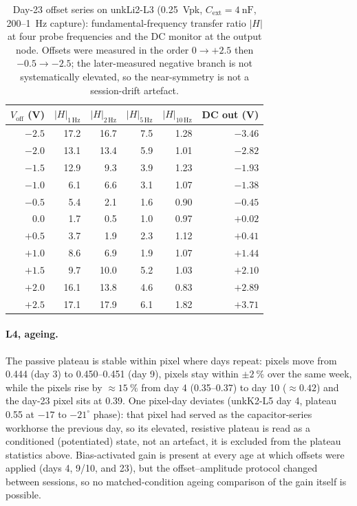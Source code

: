 \begin{table}[t]
  \centering
  \caption[Lock-in day-23 bias series]{Day-23 offset series on unkLi2-L3
  (\SI{0.25}{Vpk}, \(C_\mathrm{ext}=\SI{4}{\nano\farad}\), 200--1~Hz capture):
  fundamental-frequency transfer ratio \(|H|\) at four probe frequencies and
  the DC monitor at the output node. Offsets were measured in the order
  \(0\to+2.5\) then \(-0.5\to-2.5\); the later-measured negative branch is not
  systematically elevated, so the near-symmetry is not a session-drift
  artefact.}
  \label{tab:ch4_lockin_gain}
  \footnotesize
  \setlength{\tabcolsep}{5.5pt}
  \begin{tabular}{rrrrrr}
    \toprule
    \(V_\mathrm{off}\) (V) & \(|H|_{1\,\mathrm{Hz}}\) & \(|H|_{2\,\mathrm{Hz}}\) & \(|H|_{5\,\mathrm{Hz}}\) & \(|H|_{10\,\mathrm{Hz}}\) & DC out (V) \\
    \midrule
    \(-2.5\) & 17.2 & 16.7 & 7.5 & 1.28 & \(-3.46\) \\
    \(-2.0\) & 13.1 & 13.4 & 5.9 & 1.01 & \(-2.82\) \\
    \(-1.5\) & 12.9 &  9.3 & 3.9 & 1.23 & \(-1.93\) \\
    \(-1.0\) &  6.1 &  6.6 & 3.1 & 1.07 & \(-1.38\) \\
    \(-0.5\) &  5.4 &  2.1 & 1.6 & 0.90 & \(-0.45\) \\
    \(0.0\)  &  1.7 &  0.5 & 1.0 & 0.97 & \(+0.02\) \\
    \(+0.5\) &  3.7 &  1.9 & 2.3 & 1.12 & \(+0.41\) \\
    \(+1.0\) &  8.6 &  6.9 & 1.9 & 1.07 & \(+1.44\) \\
    \(+1.5\) &  9.7 & 10.0 & 5.2 & 1.03 & \(+2.10\) \\
    \(+2.0\) & 16.1 & 13.8 & 4.6 & 0.83 & \(+2.89\) \\
    \(+2.5\) & 17.1 & 17.9 & 6.1 & 1.82 & \(+3.71\) \\
    \bottomrule
  \end{tabular}
\end{table}

\paragraph{L4, ageing.} The passive plateau is stable within pixel where
days repeat:  pixels move from \num{0.444} (day 3) to
\numrange{0.450}{0.451} (day 9),  pixels stay within
\(\pm\SI{2}{\percent}\) over the same week, while the  pixels rise by
\(\approx\!\SI{15}{\percent}\) from day 4 (\numrange{0.35}{0.37}) to day 10
(\(\approx\!\num{0.42}\)) and the day-23 pixel sits at \num{0.39}. One
pixel-day deviates (unkK2-L5 day 4, plateau \num{0.55} at \(-17\) to
\(-21^{\circ}\) phase): that pixel had served as the capacitor-series
workhorse the previous day, so its elevated, resistive plateau is read as a
conditioned (potentiated) state, not an artefact, it is excluded from the
plateau statistics above. Bias-activated gain is present at every age at
which offsets were applied (days 4, 9/10, and 23), but the offset--amplitude
protocol changed between sessions, so no matched-condition ageing comparison
of the gain itself is possible.

